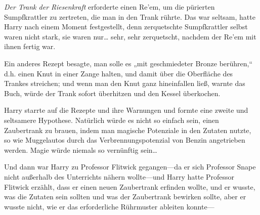 \emph{Der Trank der Riesenkraft} erforderte einen Re'em, um die pürierten Sumpfkrattler zu zertreten, die man in den Trank rührte. Das war seltsam, hatte Harry nach einem Moment festgestellt, denn zerquetschte Sumpfkrattler selbst waren nicht stark, sie waren nur… sehr, sehr zerquetscht, nachdem der Re'em mit ihnen fertig war.

Ein anderes Rezept besagte, man solle es „mit geschmiedeter Bronze berühren,“ d.h. einen Knut in einer Zange halten, und damit über die Oberfläche des Trankes streichen; und wenn man den Knut ganz hineinfallen ließ, warnte das Buch, würde der Trank sofort überhitzen und den Kessel überkochen.

Harry starrte auf die Rezepte und ihre Warnungen und formte eine zweite und seltsamere Hypothese. Natürlich würde es nicht so einfach sein, einen Zaubertrank zu brauen, indem man magische Potenziale in den Zutaten nutzte, so wie Muggelautos durch das Verbrennungspotenzial von Benzin angetrieben werden. Magie würde niemals so vernünftig sein…

Und dann war Harry zu Professor Flitwick gegangen—da er sich Professor Snape nicht außerhalb des Unterrichts nähern wollte—und Harry hatte Professor Flitwick erzählt, dass er einen neuen Zaubertrank erfinden wollte, und er wusste, was die Zutaten sein sollten und was der Zaubertrank bewirken sollte, aber er wusste nicht, wie er das erforderliche Rührmuster ableiten konnte—

